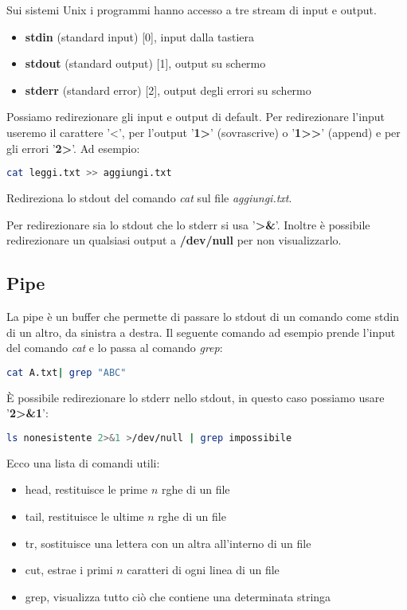 \documentclass[../main.tex]{subfiles}
\begin{document}
Sui sistemi Unix i programmi hanno accesso a tre stream di input e output.
\begin{itemize}
    \item \textbf{stdin} (standard input) [0], input dalla tastiera
    \item \textbf{stdout} (standard output) [1], output su schermo
    \item \textbf{stderr} (standard error) [2], output degli errori su schermo
\end{itemize}

Possiamo redirezionare gli input e output di default. Per redirezionare l'input useremo il carattere '<', per l'output '\textbf{1>}' (sovrascrive)
o '\textbf{1>\phantom{}>}' (append) e per gli errori '\textbf{2>}'. Ad esempio:

\begin{lstlisting}[language=bash, frame=l]
    cat leggi.txt >> aggiungi.txt
\end{lstlisting}
Redireziona lo stdout del comando \textit{cat} sul file \textit{aggiungi.txt}.

Per redirezionare sia lo stdout che lo stderr si usa '\textbf{>\&}'. Inoltre è possibile redirezionare un qualsiasi output a \textbf{/dev/null} per non visualizzarlo.

\subsection{Pipe}
La pipe è un buffer che permette di passare lo stdout di un comando come stdin di un altro, da sinistra a destra. Il seguente comando 
ad esempio prende l'input del comando \textit{cat} e lo passa al comando \textit{grep}:
\begin{lstlisting}[language=bash, frame=l]
    cat A.txt| grep "ABC"
\end{lstlisting}

È possibile redirezionare lo stderr nello stdout, in questo caso possiamo usare '\textbf{2>\&1}':
\begin{lstlisting}[language=bash, frame=l]
    ls nonesistente 2>&1 >/dev/null | grep impossibile
\end{lstlisting}

Ecco una lista di comandi utili:
\begin{itemize}
    \item head, restituisce le prime $n$ rghe di un file
    \item tail, restituisce le ultime $n$ rghe di un file
    \item tr, sostituisce una lettera con un altra all'interno di un file
    \item cut, estrae i primi $n$ caratteri di ogni linea di un file
    \item grep, visualizza tutto ciò che contiene una determinata stringa
\end{itemize}
\end{document}
